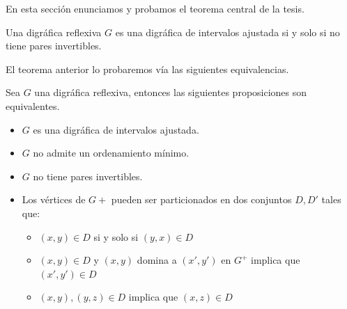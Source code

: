 En esta sección enunciamos y probamos el teorema central de la tesis. 

\begin{teorema}
    Una digráfica reflexiva $G$ es una digráfica de intervalos ajustada si y solo si no tiene pares invertibles.
\end{teorema}

El teorema anterior lo probaremos vía las siguientes equivalencias.

 \begin{teorema}
     Sea $G$ una digráfica reflexiva, entonces las siguientes proposiciones son equivalentes.
\begin{itemize}
  \item $G$ es una digráfica de intervalos ajustada.
  \item $G$ no admite un ordenamiento mínimo.
  \item $G$ no tiene pares invertibles.
  \item Los vértices de $G+$ pueden ser particionados en dos conjuntos $D, D'$ tales que:
        \begin{itemize}
            \item $(x,y)\in D $ si y solo si $ (y,x) \in D$
            \item $(x,y)\in D$ y $(x,y)$ domina a $(x',y')$ en $G^+$ implica que $(x',y')\in D$
            \item $(x,y), (y,z)\in D$ implica que $(x,z)\in D$
        \end{itemize}
\end{itemize}
     
        
        
        
        
 \end{teorema}
